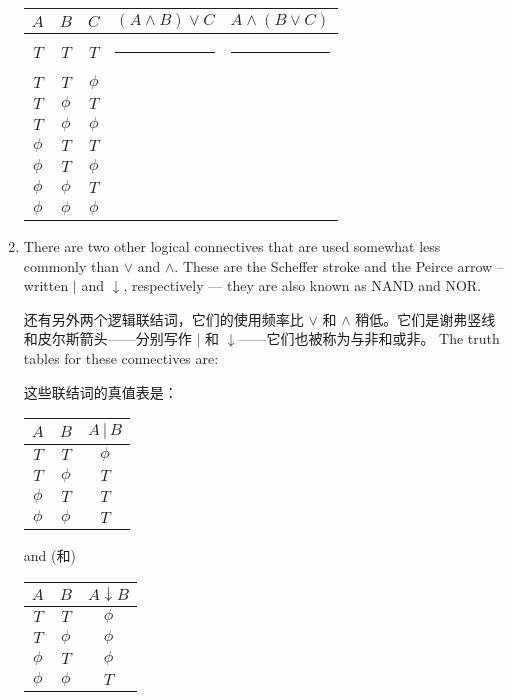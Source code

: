 \begin{enumerate}
{    \begin{tabular}{|c|c|c|c|c|} \hline
    \rule[-8pt]{0pt}{30pt}$A$ & $B$ & $C$ & $(A \land B) \lor C$ & $A \land (B \lor C)$ \\ \hline
    \rule[-8pt]{0pt}{30pt}$T$ & $T$ & $T$ & \rule{100pt}{0pt} & \rule{100pt}{0pt} \\ \hline
    \rule[-8pt]{0pt}{30pt}$T$ & $T$ & $\phi$  & & \\ \hline
    \rule[-8pt]{0pt}{30pt}$T$ & $\phi$  & $T$ & & \\ \hline
    \rule[-8pt]{0pt}{30pt}$T$ & $\phi$  & $\phi$  & & \\  \hline
    \rule[-8pt]{0pt}{30pt}$\phi$  & $T$ & $T$ & & \\ \hline
    \rule[-8pt]{0pt}{30pt}$\phi$  & $T$ & $\phi$  & & \\ \hline
    \rule[-8pt]{0pt}{30pt}$\phi$  & $\phi$  & $T$ & & \\ \hline
    \rule[-8pt]{0pt}{30pt}$\phi$  & $\phi$  & $\phi$  & & \\  \hline
    \end{tabular}
    }
    \vfill
    
    \hintspagebreak
    \workbookpagebreak
    
    \item 
    \label{ex:nand_nor} There are two other logical connectives that are
    used somewhat less commonly than $\lor$ and $\land$.
    These are the  Scheffer stroke and the 
    Peirce arrow
    -- written $\vert$ and $\downarrow$, respectively ---  they are 
    also known as  NAND and  NOR.
    
    还有另外两个逻辑联结词，它们的使用频率比 $\lor$ 和 $\land$ 稍低。它们是谢弗竖线和皮尔斯箭头——分别写作 $\vert$ 和 $\downarrow$——它们也被称为与非和或非。
    \noindent The truth tables for these connectives are:
    \medskip
    
    \noindent 这些联结词的真值表是：
    \medskip
    
    \begin{tabular}{c|c|c}
    $A$ & $B$ & $A \,\vert\, B$ \\ \hline
    $T$ & $T$ & $\phi$ \\
    $T$ & $\phi$ & $T$ \\
    $\phi$ & $T$ & $T$ \\
    $\phi$ & $\phi$ & $T$ 
    \end{tabular}
    \hspace{.25 in} and (和) \hspace{.25 in}
    \begin{tabular}{c|c|c}
    $A$ & $B$ & $A \downarrow B$ \\ \hline
    $T$ & $T$ & $\phi$ \\
    $T$ & $\phi$ & $\phi$ \\
    $\phi$ & $T$ & $\phi$ \\
    $\phi$ & $\phi$ & $T$ 
    \end{tabular}
    \medskip
    

\end{enumerate}
